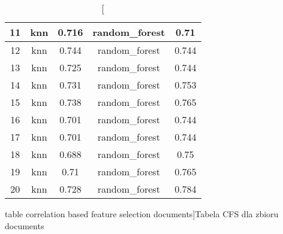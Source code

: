 \documentclass{classrep}
\begin{document}
{{{\begin{table}[!htbp]
\begin{tabular}{|c|c|c|c|c|}
                        11 & knn & 0.716 & random\_forest & 0.71 \\ \hline
                        12 & knn & 0.744 & random\_forest & 0.744 \\ \hline
                        13 & knn & 0.725 & random\_forest & 0.744 \\ \hline
                        14 & knn & 0.731 & random\_forest & 0.753 \\ \hline
                        15 & knn & 0.738 & random\_forest & 0.765 \\ \hline
                        16 & knn & 0.701 & random\_forest & 0.744 \\ \hline
                        17 & knn & 0.701 & random\_forest & 0.744 \\ \hline
                        18 & knn & 0.688 & random\_forest & 0.75 \\ \hline
                        19 & knn & 0.71 & random\_forest & 0.765 \\ \hline
                        20 & knn & 0.728 & random\_forest & 0.784 \\ \hline
                    \end{tabular}
                    \caption
                    [table correlation based feature selection documents]{Tabela CFS dla zbioru documents}
                    \label{table_correlation_based_feature_selection_documents}
                \end{table}
                \FloatBarrier

            }
        }

    }
\end{document}
